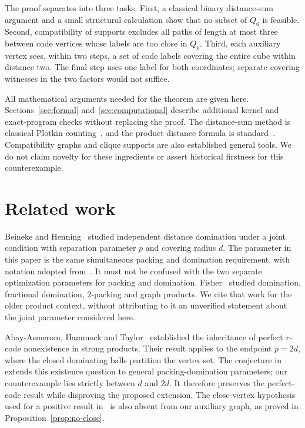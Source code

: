 \documentclass[11pt]{article}
\theoremstyle{definition}
\theoremstyle{remark}
\begin{document}
The proof separates into three tasks. First, a classical binary
distance-sum argument and a small structural calculation show that no
subset of \(Q_6\) is feasible. Second, compatibility of supports excludes
all paths of length at most three between code vertices whose labels
are too close in \(Q_6\). Third, each auxiliary vertex sees, within
two steps, a set of code labels covering the entire cube within
distance two. The final step uses one label for both coordinates;
separate covering witnesses in the two factors would not suffice.

All mathematical arguments needed for the theorem are given here.
Sections~\ref{sec:formal} and~\ref{sec:computational} describe additional
kernel and exact-program checks without replacing the proof.
The distance-sum method is classical Plotkin counting~\cite{plotkin},
and the product distance formula is standard~\cite{handbook}.
Compatibility graphs and clique supports are also established general
tools. We do not claim novelty for these ingredients or assert
historical firstness for this counterexample.

\section{Related work}\label{sec:related}
Beineke and Henning~\cite{beineke-henning} studied independent distance
domination under a joint condition with separation parameter \(p\)
and covering radius \(d\). The
parameter in this paper is the same simultaneous packing and domination
requirement, with notation adopted from~\cite{bickz-strong}. It must not
be confused with the two separate optimization parameters for packing
and domination. Fisher~\cite{fisher} studied domination, fractional
domination, 2-packing and graph products. We cite that work for the
older product context, without attributing to it an unverified
statement about the joint parameter considered here.

Abay-Asmerom, Hammack and Taylor~\cite{perfect} established the
inheritance of perfect \(r\)-code nonexistence in strong products.
Their result applies to the endpoint \(p=2d\), where the closed
dominating balls partition the vertex set. The conjecture
in~\cite{bickz-strong} extends this existence question to general
packing-domination parameters; our counterexample lies strictly
between \(d\) and \(2d\). It therefore preserves the perfect-code
result while disproving the proposed extension. The close-vertex
hypothesis used for a positive result in~\cite{bickz-strong} is also
absent from our auxiliary graph, as proved in
Proposition~\ref{prop:no-close}.
\end{document}
